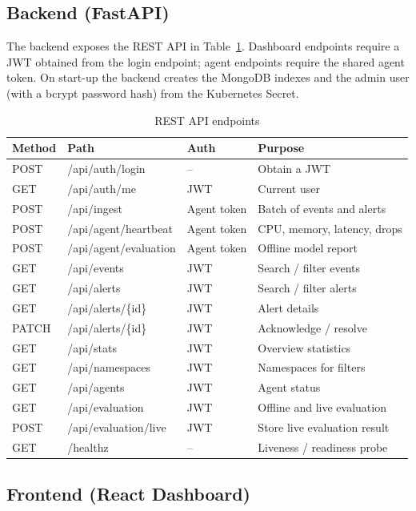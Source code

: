 \subsection{Backend (FastAPI)}

The backend exposes the REST API in Table~\ref{tab:api}. Dashboard endpoints require a
JWT obtained from the login endpoint; agent endpoints require the shared agent token.
On start-up the backend creates the MongoDB indexes and the admin user (with a bcrypt
password hash) from the Kubernetes Secret.

\begin{table}[H]
\centering
\caption{REST API endpoints}
\label{tab:api}
\small
\begin{tabularx}{\textwidth}{l >{\ttfamily}l l >{\raggedright\arraybackslash}X}
\toprule
\textbf{Method} & \normalfont\textbf{Path} & \textbf{Auth} & \textbf{Purpose} \\
\midrule
POST  & /api/auth/login & -- & Obtain a JWT \\
GET   & /api/auth/me & JWT & Current user \\
POST  & /api/ingest & Agent token & Batch of events and alerts \\
POST  & /api/agent/heartbeat & Agent token & CPU, memory, latency, drops \\
POST  & /api/agent/evaluation & Agent token & Offline model report \\
GET   & /api/events & JWT & Search / filter events \\
GET   & /api/alerts & JWT & Search / filter alerts \\
GET   & /api/alerts/\{id\} & JWT & Alert details \\
PATCH & /api/alerts/\{id\} & JWT & Acknowledge / resolve \\
GET   & /api/stats & JWT & Overview statistics \\
GET   & /api/namespaces & JWT & Namespaces for filters \\
GET   & /api/agents & JWT & Agent status \\
GET   & /api/evaluation & JWT & Offline and live evaluation \\
POST  & /api/evaluation/live & JWT & Store live evaluation result \\
GET   & /healthz & -- & Liveness / readiness probe \\
\bottomrule
\end{tabularx}
\end{table}

\subsection{Frontend (React Dashboard)}

